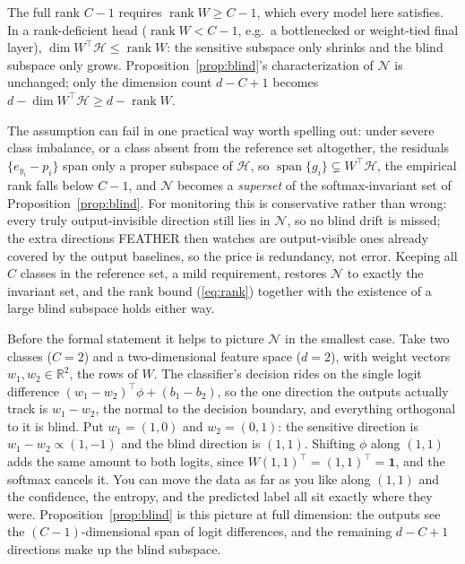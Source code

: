 \documentclass[acmsmall,screen]{acmart}
\theoremstyle{acmdefinition}
\newcommand{\R}{\mathbb{R}}
\newcommand{\act}{\phi}
\DeclareMathOperator{\rank}{rank}
\DeclareMathOperator{\spn}{span}
\begin{document}
The full rank $C-1$ requires $\rank W \ge C-1$, which every model here
satisfies. In a rank-deficient head ($\rank W < C-1$, e.g.\ a bottlenecked
or weight-tied final layer), $\dim W^\top\!\mathcal{H} \le \rank W$: the
sensitive subspace only shrinks and the blind subspace only grows.
Proposition~\ref{prop:blind}'s characterization of $\mathcal{N}$ is
unchanged; only the dimension count $d - C + 1$ becomes
$d - \dim W^\top\!\mathcal{H} \ge d - \rank W$.

The assumption can fail in one practical way worth spelling out: under severe
class imbalance, or a class absent from the reference set altogether, the
residuals $\{e_{y_i} - p_i\}$ span only a proper subspace of $\mathcal{H}$, so
$\spn\{g_i\} \subsetneq W^\top\!\mathcal{H}$, the empirical rank falls below
$C-1$, and $\mathcal{N}$ becomes a \emph{superset} of the softmax-invariant set
of Proposition~\ref{prop:blind}. For monitoring this is conservative rather than
wrong: every truly output-invisible direction still lies in $\mathcal{N}$, so no
blind drift is missed; the extra directions FEATHER then watches are
output-visible ones already covered by the output baselines, so the price is
redundancy, not error. Keeping all $C$ classes in the reference set, a mild
requirement, restores $\mathcal{N}$ to exactly the invariant set, and the rank
bound (\ref{eq:rank}) together with the existence of a large blind subspace
holds either way.

Before the formal statement it helps to picture $\mathcal{N}$ in the smallest
case. Take two classes ($C = 2$) and a two-dimensional feature space
($d = 2$), with weight vectors $w_1, w_2 \in \R^2$, the rows of $W$. The
classifier's decision rides on the single logit difference
$(w_1 - w_2)^\top\act + (b_1 - b_2)$, so the one direction the outputs
actually track is $w_1 - w_2$, the normal to the decision boundary, and
everything orthogonal to it is blind. Put $w_1 = (1,0)$ and $w_2 = (0,1)$: the
sensitive direction is $w_1 - w_2 \propto (1,-1)$ and the blind direction is
$(1,1)$. Shifting $\act$ along $(1,1)$ adds the same amount to both logits,
since $W(1,1)^\top = (1,1)^\top = \mathbf{1}$, and the softmax cancels it. You
can move the data as far as you like along $(1,1)$ and the confidence, the
entropy, and the predicted label all sit exactly where they were.
Proposition~\ref{prop:blind} is this picture at full dimension: the outputs
see the $(C-1)$-dimensional span of logit differences, and the remaining
$d - C + 1$ directions make up the blind subspace.
\end{document}
